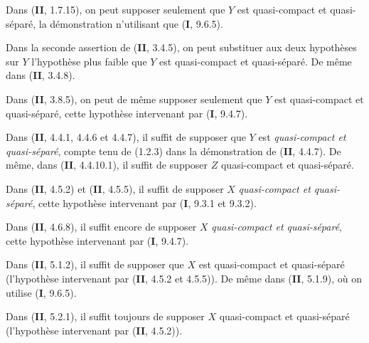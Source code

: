 \begin{env}[1.7.10]
\label{IV.1.7.10-fr}
Dans (\textbf{II}, 1.7.15), on peut supposer seulement que $Y$ est quasi-compact et
quasi-séparé, la démonstration n'utilisant que (\textbf{I}, 9.6.5).
\end{env}

\begin{env}[1.7.11]
\label{IV.1.7.11-fr}
Dans la seconde assertion de (\textbf{II}, 3.4.5), on peut substituer aux deux
hypothèses sur $Y$ l'hypothèse plus faible que $Y$ est quasi-compact et
quasi-séparé. De même dans (\textbf{II}, 3.4.8).
\end{env}

\begin{env}[1.7.12]
\label{IV.1.7.12-fr}
Dans (\textbf{II}, 3.8.5), on peut de même supposer seulement que $Y$ est quasi-compact
et quasi-séparé, cette hypothèse intervenant par (\textbf{I}, 9.4.7).
\end{env}

\begin{env}[1.7.13]
\label{IV.1.7.13-fr}
Dans (\textbf{II}, 4.4.1, 4.4.6 et 4.4.7), il suffit de supposer que $Y$ est
\emph{quasi-compact et quasi-séparé}, compte tenu de (1.2.3) dans la
démonstration de (\textbf{II}, 4.4.7). De même, dans (\textbf{II}, 4.4.10.1), il suffit de
supposer $Z$ quasi-compact et quasi-séparé.
\end{env}

\begin{env}[1.7.14]
\label{IV.1.7.14-fr}
Dans (\textbf{II}, 4.5.2) et (\textbf{II}, 4.5.5), il suffit de supposer $X$
\emph{quasi-compact et quasi-séparé}, cette hypothèse intervenant par (\textbf{I},
9.3.1 et 9.3.2).
\end{env}

\begin{env}[1.7.15]
\label{IV.1.7.15-fr}
Dans (\textbf{II}, 4.6.8), il suffit encore de supposer $X$ \emph{quasi-compact et
quasi-séparé}, cette hypothèse intervenant par (\textbf{I}, 9.4.7).
\end{env}

\begin{env}[1.7.16]
\label{IV.1.7.16-fr}
Dans (\textbf{II}, 5.1.2), il suffit de supposer que $X$ est quasi-compact et
quasi-séparé (l'hypothèse intervenant par (\textbf{II}, 4.5.2 et 4.5.5)). De même dans
(\textbf{II}, 5.1.9), où on utilise (\textbf{I}, 9.6.5).
\end{env}

\begin{env}[1.7.17]
\label{IV.1.7.17-fr}
Dans (\textbf{II}, 5.2.1), il suffit toujours de supposer $X$ quasi-compact et
quasi-séparé (l'hypothèse intervenant par (\textbf{II}, 4.5.2)).
\end{env}

